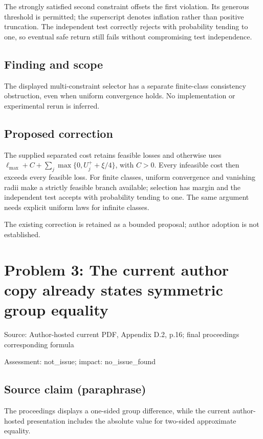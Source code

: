 \documentclass[11pt]{article}
\begin{document}
The strongly satisfied second constraint offsets the first violation. Its generous threshold is permitted; the superscript denotes inflation rather than positive truncation. The independent test correctly rejects with probability tending to one, so eventual safe return still fails without compromising test independence.

\subsection*{Finding and scope}

The displayed multi-constraint selector has a separate finite-class consistency obstruction, even when uniform convergence holds. No implementation or experimental rerun is inferred.

\subsection*{Proposed correction}

The supplied separated cost retains feasible losses and otherwise uses \(\ell_{\max}+C+\sum_j\max\{0,U_j^++\xi/4\}\), with \(C>0\). Every infeasible cost then exceeds every feasible loss. For finite classes, uniform convergence and vanishing radii make a strictly feasible branch available; selection has margin and the independent test accepts with probability tending to one. The same argument needs explicit uniform laws for infinite classes.

The existing correction is retained as a bounded proposal; author adoption is not established.

\section*{Problem 3: The current author copy already states symmetric group equality}

Source: Author-hosted current PDF, Appendix D.2, p.16; final proceedings corresponding formula

Assessment: not\_issue; impact: no\_issue\_found

\subsection*{Source claim (paraphrase)}

The proceedings displays a one-sided group difference, while the current author-hosted presentation includes the absolute value for two-sided approximate equality.
\end{document}
